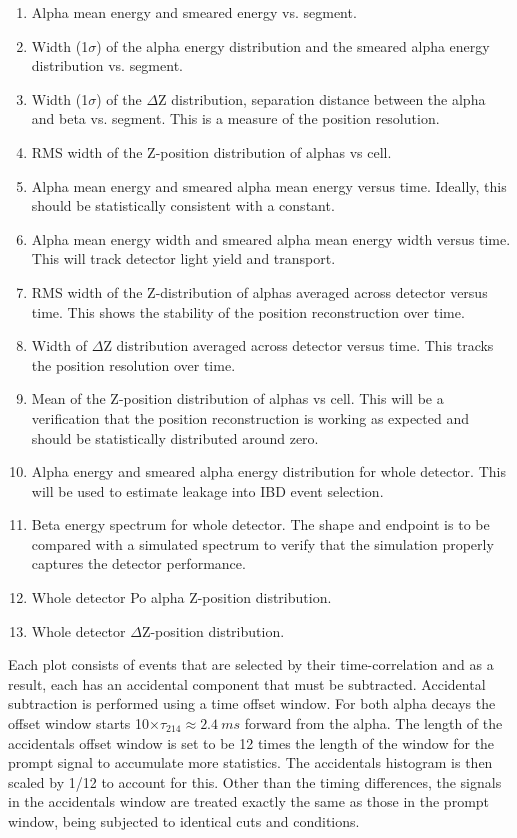 \begin{enumerate}
\item{Alpha mean energy and smeared energy vs. segment.}
\item{Width (1$\sigma$) of the alpha energy distribution and the smeared alpha energy distribution vs. segment.}
\item{Width (1$\sigma$) of the $\Delta$Z distribution, separation distance between the alpha and beta vs. segment. This is a measure of the position resolution.}
\item{RMS width of the Z-position distribution of alphas vs cell.}
\item{Alpha mean energy and smeared alpha mean energy versus time. Ideally, this should be statistically consistent with a constant.}
\item{Alpha mean energy width and smeared alpha mean energy width versus time. This will track detector light yield and transport.}
\item{RMS width of the Z-distribution of alphas averaged across detector versus time. This shows the stability of the position reconstruction over time.}
\item{Width of $\Delta$Z distribution averaged across detector versus time. This tracks the position resolution over time.}
\item{Mean of the Z-position distribution of alphas vs cell. This will be a verification that the position reconstruction is working as expected and should be statistically distributed around zero.}
\item{Alpha energy and smeared alpha energy distribution for whole detector. This will be used to estimate leakage into IBD event selection.}
\item{Beta energy spectrum for whole detector. The shape and endpoint is to be compared with a simulated spectrum to verify that the simulation properly captures the detector performance. }
\item{Whole detector Po alpha Z-position distribution.}
\item{Whole detector $\Delta$Z-position distribution.}
\end{enumerate}
Each plot consists of events that are selected by their time-correlation and as a result, each has an accidental component that must be subtracted. Accidental subtraction is performed using a time offset window. For both alpha decays the offset window starts 10$\times\tau_{214}\approx2.4~ms$ forward from the alpha. The length of the accidentals offset window is set to be 12 times the length of the window for the prompt signal to accumulate more statistics. The accidentals histogram is then scaled by 1/12 to account for this. Other than the timing differences, the signals in the accidentals window are treated exactly the same as those in the prompt window, being subjected to identical cuts and conditions.

